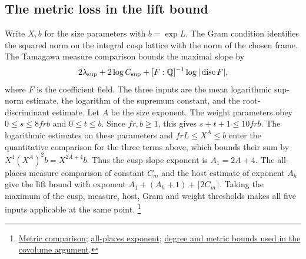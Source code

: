 \subsection{The metric loss in the lift bound}
Write \(X,b\) for the size parameters with \(b=\exp L\). The Gram
condition identifies the squared norm on the integral cusp lattice with
the norm of the chosen frame. The Tamagawa measure comparison bounds
the maximal slope by
\[
 2\lambda_{\rm sup}+2\log C_{\rm sup}+
 [F:\mathbb Q]^{-1}\log|\operatorname{disc}F|,
\]
where \(F\) is the coefficient field. The three inputs are the mean
logarithmic sup-norm estimate, the logarithm of the supremum constant,
and the root-discriminant estimate. Let \(A\) be the size exponent.
The weight parameters obey \(0\le s\le8frb\) and \(0\le t\le b\).
Since \(fr,b\ge1\), this gives \(s+t+1\le10frb\). The logarithmic
estimates on these parameters and \(frL\le X^A\le b\) enter the
quantitative comparison for the three terms above, which bounds their
sum by \(X^4(X^A)^2b=X^{2A+4}b\). Thus the cusp-slope exponent is
\(A_1=2A+4\). The all-places measure comparison of constant \(C_m\)
and the host estimate of exponent \(A_h\) give the lift bound with
exponent \(A_1+(A_h+1)+\lceil2C_m\rceil\). Taking the maximum of
the cusp, measure, host, Gram and weight thresholds makes all five
inputs applicable at the same point.
\footnote{\href{https://github.com/Deicyde/riemann-hypothesis/blob/40e56bab/src/Development/AutomorphicArithmetic/ThetaCorrespondence/FockModels/TamagawaPeterssonLambdaSqNonneg.lean\#L596-L669}{Metric comparison};
\href{https://github.com/Deicyde/riemann-hypothesis/blob/40e56bab/src/Development/AutomorphicArithmetic/ThetaCorrespondence/ThetaPairLifts/ThirdPlaceSeries/CoveringLambdaInvariantBound.lean\#L21-L37}{all-places exponent};
\href{https://github.com/Deicyde/riemann-hypothesis/blob/40e56bab/src/Development/AutomorphicArithmetic/ThetaCorrespondence/ThetaPairLifts/ThirdPlaceSeries/TopCovolG.lean\#L50-L58}{degree and metric bounds used in the covolume argument}.}
